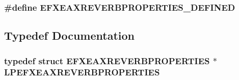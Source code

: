 \subsubsection[{\texorpdfstring{E\+F\+X\+E\+A\+X\+R\+E\+V\+E\+R\+B\+P\+R\+O\+P\+E\+R\+T\+I\+E\+S\+\_\+\+D\+E\+F\+I\+N\+ED}{EFXEAXREVERBPROPERTIES_DEFINED}}]{\setlength{\rightskip}{0pt plus 5cm}\#define E\+F\+X\+E\+A\+X\+R\+E\+V\+E\+R\+B\+P\+R\+O\+P\+E\+R\+T\+I\+E\+S\+\_\+\+D\+E\+F\+I\+N\+ED}\hypertarget{efx-presets_8h_ace330587ef80ff1a1c4590be4a35fe86}{}\label{efx-presets_8h_ace330587ef80ff1a1c4590be4a35fe86}


\subsection{Typedef Documentation}
\subsubsection[{\texorpdfstring{L\+P\+E\+F\+X\+E\+A\+X\+R\+E\+V\+E\+R\+B\+P\+R\+O\+P\+E\+R\+T\+I\+ES}{LPEFXEAXREVERBPROPERTIES}}]{\setlength{\rightskip}{0pt plus 5cm}typedef  struct {\bf E\+F\+X\+E\+A\+X\+R\+E\+V\+E\+R\+B\+P\+R\+O\+P\+E\+R\+T\+I\+ES} $\ast$ {\bf L\+P\+E\+F\+X\+E\+A\+X\+R\+E\+V\+E\+R\+B\+P\+R\+O\+P\+E\+R\+T\+I\+ES}}\hypertarget{efx-presets_8h_adc46e4b6e623551dd7ef8b35f268461d}{}\label{efx-presets_8h_adc46e4b6e623551dd7ef8b35f268461d}

